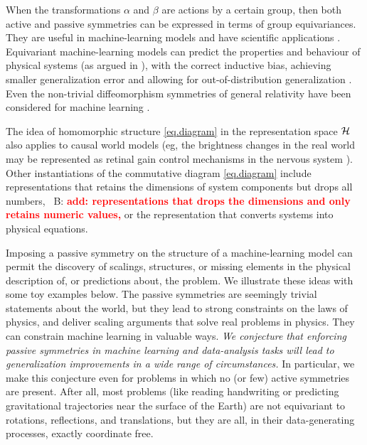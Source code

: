 \documentclass{article}
\theoremstyle{plain}
\theoremstyle{definition}
\theoremstyle{remark}
\newcommand{\bernhard}[1]{~B: \textcolor{red}{\textbf{#1}}}
\begin{document}
When the transformations $\alpha$ and $\beta$ are actions by a certain group, then both active and passive symmetries can be expressed in terms of group equivariances.
They are useful in machine-learning models \cite{cohen2016group, kondor2018convolution, thomas2018tensor, geiger2022e3nn, finzi2020generalizing, finzi2021practical} and have scientific applications \cite{batzner20223, musaelian2022learning, stark2022equibind, yu-physics, wang2022approximately}.
Equivariant machine-learning models can predict the properties and behaviour of physical systems (as argued in \cite{cheng2019covariance}), with the correct inductive bias, achieving smaller generalization error \cite{bietti2021sample, elesedy2021provably, elesedy2021kernel, mei2021learning} and allowing for out-of-distribution generalization \cite{villar2022dimensionless}. 
Even the non-trivial diffeomorphism symmetries of general relativity have been considered for machine learning \cite{weiler}.

The idea of homomorphic structure \eqref{eq.diagram} in the representation space $\cal H$ also applies to causal world models (eg, the brightness changes in the real world may be represented as retinal gain control mechanisms in the nervous system \cite{1911.10500}).
 Other instantiations of the commutative diagram \eqref{eq.diagram} include representations that retains the dimensions of system components but drops all numbers, \bernhard{add: representations that drops the dimensions and only retains numeric values,} or the representation that converts systems into physical equations.

Imposing a passive symmetry on the structure of a machine-learning model can permit the discovery of scalings, structures, or missing elements in the physical description of, or predictions about, the problem.
We illustrate these ideas with some toy examples below.
The passive symmetries are seemingly trivial statements about the world, but they lead to strong constraints on the laws of physics, and deliver scaling arguments that solve real problems in physics.
They can constrain machine learning in valuable ways.
\emph{We conjecture that enforcing passive symmetries in machine learning and data-analysis tasks will lead to generalization improvements in a wide range of circumstances.}
In particular, we make this conjecture even for problems in which no (or few) active symmetries are present.
After all, most problems (like reading handwriting or predicting gravitational trajectories near the surface of the Earth) are not equivariant to rotations, reflections, and translations, but they are all, in their data-generating processes, exactly coordinate free.
\end{document}
